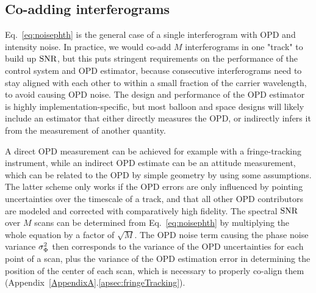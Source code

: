 \subsection{Co-adding interferograms}

Eq.~\ref{eq:noisephth} is the general case of a single interferogram with OPD and intensity noise. In practice, we would co-add $M$ interferograms in one "track" to build up $\textrm{SNR}$, but this puts stringent requirements on the performance of the control system and OPD estimator, because consecutive interferograms need to stay aligned with each other to within a small fraction of the carrier wavelength, to avoid causing OPD noise. The design and performance of the OPD estimator is highly implementation-specific, but most balloon and space designs will likely include an estimator that either directly measures the OPD, or indirectly infers it from the measurement of another quantity. 

A direct OPD measurement can be achieved for example with a fringe-tracking instrument, while an indirect OPD estimate can be an attitude measurement, which can be related to the OPD by simple geometry by using some assumptions. The latter scheme only works if the OPD errors are only influenced by pointing uncertainties over the timescale of a track, and that all other OPD contributors are modeled and corrected with comparatively high fidelity. The spectral $\textrm{SNR}$ over $M$ scans can be determined from Eq.~\ref{eq:noisephth} by multiplying the whole equation by a factor of $\sqrt{M}$. The OPD noise term causing the phase noise variance $\sigma^2_\Phi$ then corresponds to the variance of the OPD uncertainties for each point of a scan, plus the variance of the OPD estimation error in determining the position of the center of each scan, which is necessary to properly co-align them (Appendix~\ref{AppendixA}.\ref{apsec:fringeTracking}).




